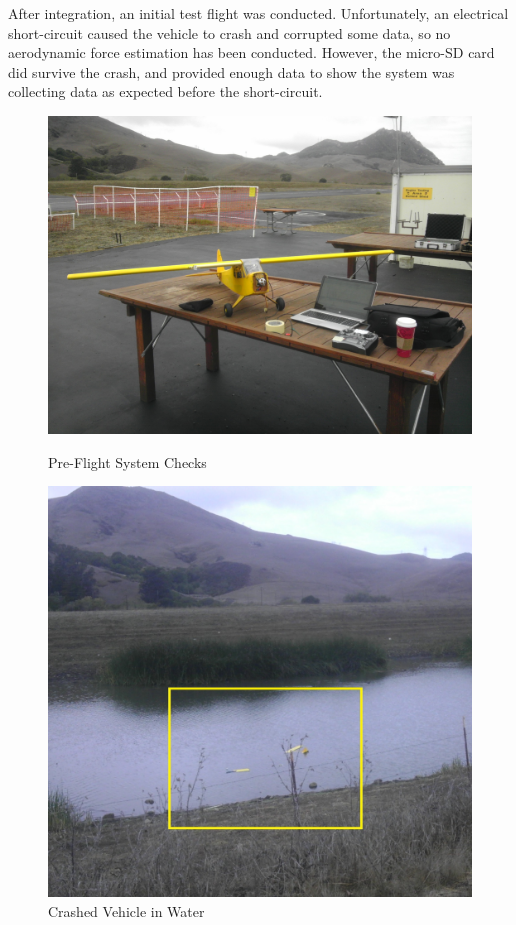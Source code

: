 After integration, an initial test flight was conducted. Unfortunately, an electrical short-circuit caused the vehicle to  crash and corrupted some data, so no aerodynamic force estimation has been conducted. However, the micro-SD card did survive the crash, and provided enough data to show the system was collecting data as expected before the short-circuit.
\begin{figure}[H]
\label{sysIntPics}
\centering
\begin{minipage}[b]{0.45\linewidth}
\label{preFlightFig}
  \centering
    \includegraphics[height=0.5\textheight]{figures/preFlight.jpg}
    \caption{Pre-Flight System Checks}
\end{minipage}
\begin{minipage}[b]{0.45\linewidth}
  \centering
    \includegraphics[height=0.5\textheight]{figures/crash.jpg}
    \caption{Crashed Vehicle in Water}
\end{minipage}
\end{figure}

